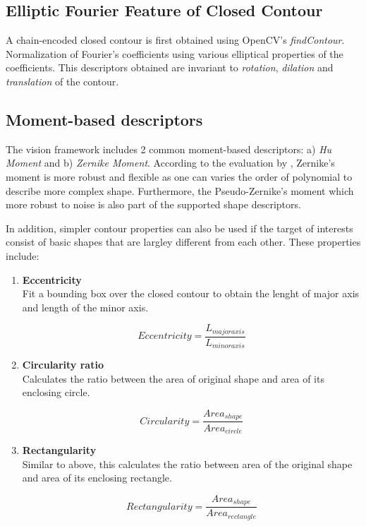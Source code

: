 \documentclass[hyp]{socreport}
\begin{document}
\subsection{Elliptic Fourier Feature of Closed Contour}

A chain-encoded closed contour is first obtained using OpenCV's
\textit{findContour}. Normalization of Fourier's coefficients using various
elliptical properties of the coefficients. This descriptors obtained are
invariant to \textit{rotation}, \textit{dilation} and \textit{translation} of
the contour.

\subsection{Moment-based descriptors}

The vision framework includes 2 common moment-based descriptors: a) \textit{Hu Moment}
and b) \textit{Zernike Moment}. According to the evaluation by
, Zernike's moment is more robust and flexible
as one can varies the order of polynomial to describe more complex shape.
Furthermore, the Pseudo-Zernike's moment which more robust to noise is also part
of the supported shape descriptors.

In addition, simpler contour properties can also be used if the target of
interests consist of basic shapes that are largley different from each other.
These properties include:

\begin{enumerate}

  \item \textbf{Eccentricity} \\
  Fit a bounding box over the closed contour to obtain the lenght of major axis
  and length of the minor axis.

  \[
    Eccentricity = \frac{L_{major axis}}{L_{minor axis}}
  \]

  \item \textbf{Circularity ratio} \\
  Calculates the ratio between the area of original shape and area of its enclosing circle.

  \[
    Circularity = \frac{Area_{shape}}{Area_{circle}}
  \]

  \item \textbf{Rectangularity} \\
  Similar to above, this calculates the ratio between area of the original shape
  and area of its enclosing rectangle.

  \[
    Rectangularity = \frac{Area_{shape}}{Area_{rectangle}}
  \]

\end{enumerate}
\end{document}
